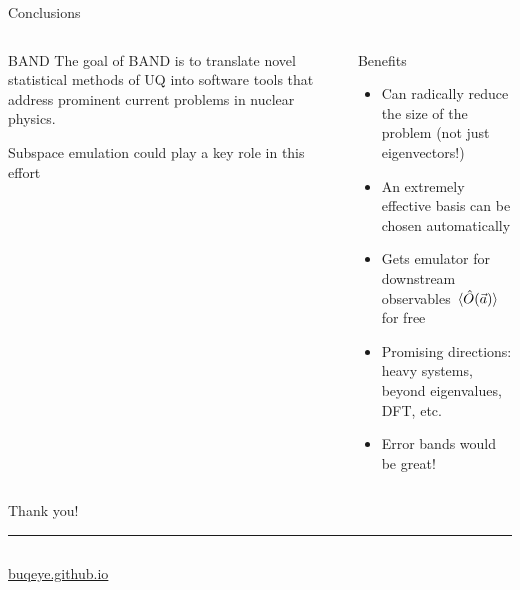 \documentclass[xcolor=dvipsnames, aspectratio=169]{beamer}
\begin{document}
\begin{frame}{Conclusions}

\begin{columns}[t]
\begin{column}{0.4\textwidth}
\begin{myblock}[valign=center]{BAND}
The goal of BAND is to translate novel statistical methods of UQ into
software tools that address prominent current problems in nuclear physics.
\end{myblock}
Subspace emulation could play a key role in this effort
\end{column}
\begin{column}{0.6\textwidth}
\begin{myblock}[valign=center]{Benefits}
\setlength\leftmargini{0pt}
\begin{itemize}
\item Can radically reduce the size of the problem (not just \alert{eigenvectors}!)
\item An extremely effective basis can be chosen \alert{automatically}
\item Gets emulator for downstream observables $\ev*{\hat O(\lecs)}$ \alert{for free}
\end{itemize}
\end{myblock}
\begin{itemize}
\item Promising directions: heavy systems, beyond eigenvalues, DFT, etc.
\item Error bands would be great!
\end{itemize}
\end{column}
\end{columns}
\end{frame}



\appendix

\begin{frame}[standout,t]

\vspace{.2in}

Thank you!
\noindent\rule{\textwidth}{1pt}


\begin{columns}
\begin{column}{0.5\textwidth}
\begin{center}
\href{https://buqeye.github.io/}{\alert{buqeye.github.io}}
\end{center}
\end{column}
\end{columns}
\end{frame}
\end{document}
